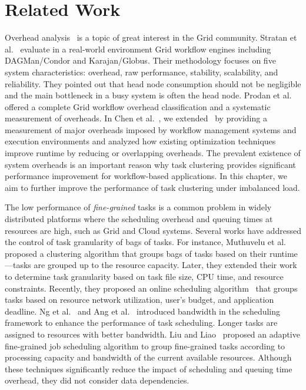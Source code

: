\section{Related Work}
\label{sec:related-work}

Overhead analysis~\cite{Ostberg2011, Prodan2008} is a topic of great interest in the Grid community. Stratan et al.~\cite{Stratan2008} evaluate in a real-world environment Grid workflow engines including DAGMan/Condor and Karajan/Globus. Their methodology focuses on five system characteristics: overhead, raw performance, stability, scalability, and reliability. They pointed out that head node consumption should not be negligible and the main bottleneck in a busy system is often the head node. Prodan et al.~\cite{Prodan2008} offered a complete Grid workflow overhead classification and a systematic measurement of overheads. In Chen et al.~\cite{Chen2011}, we extended~\cite{Prodan2008} by providing a measurement of major overheads imposed by workflow management systems and execution environments and analyzed how existing optimization techniques improve runtime by reducing or overlapping overheads. The prevalent existence of system overheads is an important reason why task clustering provides significant performance improvement for workflow-based applications. In this chapter, we aim to further improve the performance of task clustering under imbalanced load. 

The low performance of \emph{fine-grained} tasks is a common problem in widely distributed platforms where the scheduling overhead and queuing times at resources are high, such as Grid and Cloud systems. Several works have addressed the control of task granularity of bags of tasks. For instance, Muthuvelu et al.~\cite{Muthuvelu:2005:DJG:1082290.1082297} proposed a clustering algorithm that groups bags of tasks based on their runtime---tasks are grouped up to the resource capacity. Later, they extended their work~\cite{4493929} to determine task granularity based on task file size, CPU time, and resource constraints. Recently, they proposed an online scheduling algorithm~\cite{Muthuvelu2010,Muthuvelu2013170} that groups tasks based on resource network utilization, user's budget, and application deadline. Ng et al.~\cite{keat-2006} and Ang et al.~\cite{ang-2009} introduced bandwidth in the scheduling framework to enhance the performance of task scheduling. Longer tasks are assigned to resources with better bandwidth. Liu and Liao~\cite{Liu2009} proposed an adaptive fine-grained job scheduling algorithm to group fine-grained tasks according to processing capacity and bandwidth of the current available resources. Although these techniques significantly reduce the impact of scheduling and queuing time overhead, they did not consider data dependencies.

